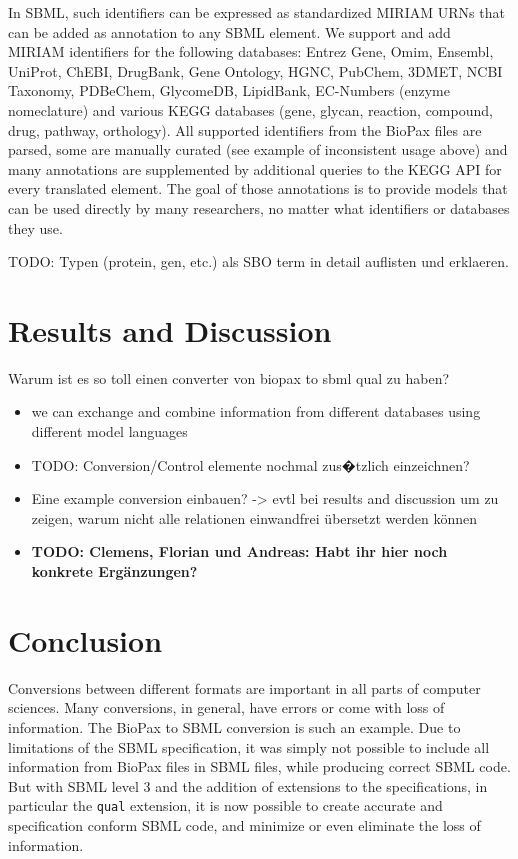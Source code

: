 \documentclass{bioinfo}
\begin{document}
\begin{methods}
In SBML, such identifiers can be expressed as standardized MIRIAM URNs that can be added as annotation to any SBML element.
We support and add MIRIAM identifiers for the following databases: Entrez Gene, Omim, Ensembl, UniProt, ChEBI, DrugBank, Gene Ontology, HGNC, PubChem, 3DMET, NCBI Taxonomy, PDBeChem, GlycomeDB, LipidBank, EC-Numbers (enzyme nomeclature) and various KEGG databases (gene, glycan, reaction, compound, drug, pathway, orthology).
All supported identifiers from the BioPax files are parsed, some are manually curated (see example of inconsistent usage above) and many annotations are supplemented by additional queries to the KEGG API for every translated element.
The goal of those annotations is to provide models that can be used directly by many researchers, no matter what identifiers or databases they use.

TODO: Typen (protein, gen, etc.) als SBO term in detail auflisten und erklaeren.

\end{methods}


\section{Results and Discussion}
Warum ist es so toll einen converter von biopax to sbml qual zu haben?
\begin{itemize}
\item we can exchange and combine information from different databases using different model languages
\item TODO: Conversion/Control elemente nochmal zus�tzlich einzeichnen?
\item Eine example conversion einbauen? -> evtl bei results and discussion um zu zeigen, warum nicht alle relationen einwandfrei \"ubersetzt werden k\"onnen
    \item \textbf{TODO: Clemens, Florian und Andreas: Habt ihr hier noch konkrete Erg\"anzungen?}
\end{itemize}

\section{Conclusion}
Conversions between different formats are important in all parts of computer sciences. Many conversions, in general, have errors or come with loss of information. The BioPax to SBML conversion is such an example. Due to limitations of the SBML specification, it was simply not possible to include all information from BioPax files in SBML files, while producing correct SBML code. But with SBML level 3 and the addition of extensions to the specifications, in particular the \texttt{qual} extension, it is now possible to create accurate and specification conform SBML code, and minimize or even eliminate the loss of information.
\end{document}

